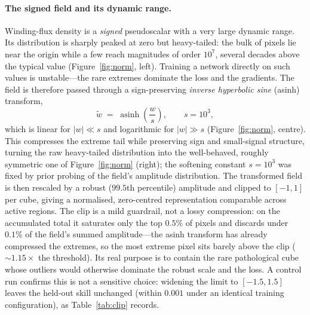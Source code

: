 

\paragraph{The signed field and its dynamic range.}
Winding-flux density is a \emph{signed} pseudoscalar with a very large dynamic
range. Its distribution is sharply peaked at zero but heavy-tailed: the bulk of
pixels lie near the origin while a few reach magnitudes of order $10^{7}$, several
decades above the typical value (Figure~\ref{fig:norm}, left). Training a network
directly on such values is unstable---the rare extremes dominate the loss and the
gradients. The field is therefore passed through a sign-preserving \emph{inverse
hyperbolic sine} (asinh) transform,
\begin{equation}
  \tilde{w} \;=\; \operatorname{asinh}\!\left(\frac{w}{s}\right),
  \qquad s = 10^{3},
  \label{eq:asinh}
\end{equation}
which is linear for $|w|\ll s$ and logarithmic for $|w|\gg s$
(Figure~\ref{fig:norm}, centre). This compresses the extreme tail while
preserving sign and small-signal structure, turning the raw heavy-tailed
distribution into the well-behaved, roughly symmetric one of
Figure~\ref{fig:norm} (right); the softening constant $s=10^{3}$ was fixed by
prior probing of the field's amplitude distribution. The transformed field is
then rescaled by a robust ($99.5$th percentile) amplitude and clipped to
$[-1,1]$ per cube, giving a normalised, zero-centred representation comparable
across active regions. The clip is a mild guardrail, not a lossy compression: on
the accumulated total it saturates only the top $0.5\%$ of pixels and discards
under $0.1\%$ of the field's summed amplitude---the asinh transform has already
compressed the extremes, so the most extreme pixel sits barely above the clip
($\sim\!1.15\times$ the threshold). Its real purpose is to contain the rare
pathological cube whose outliers would otherwise dominate the robust scale and
the loss. A control run confirms this is not a sensitive choice: widening the
limit to $[-1.5,1.5]$ leaves the held-out skill unchanged (within $0.001$ under
an identical training configuration), as Table~\ref{tab:clip} records.






